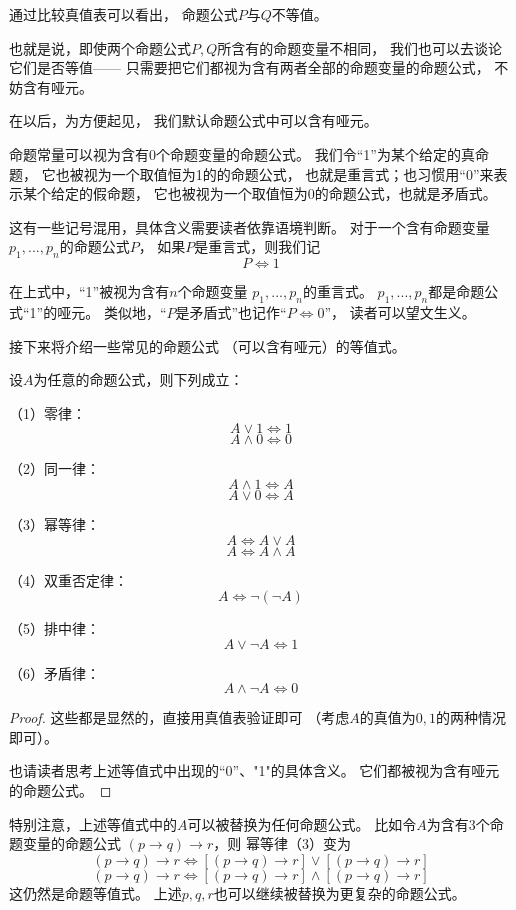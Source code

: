 通过比较真值表可以看出，
命题公式$P$与$Q$不等值。

也就是说，即使两个命题公式$P,Q$所含有的命题变量不相同，
我们也可以去谈论它们是否等值——
只需要把它们都视为含有两者全部的命题变量的命题公式，
不妨含有哑元。

在以后，为方便起见，
我们默认命题公式中可以含有哑元。

\begin{rem}命题常量可以视为含有0个命题变量的命题公式。
我们令“1”为某个给定的真命题，
它也被视为一个取值恒为1的的命题公式，
也就是重言式；也习惯用“0”来表示某个给定的假命题，
它也被视为一个取值恒为0的命题公式，也就是矛盾式。
\end{rem}

这有一些记号混用，具体含义需要读者依靠语境判断。
对于一个含有命题变量$p_1,...,p_n$的命题公式$P$，
如果$P$是重言式，则我们记
$$P\Leftrightarrow 1$$

在上式中，“1”被视为含有$n$个命题变量
$p_1,...,p_n$的重言式。
$p_1,...,p_n$都是命题公式“1”的哑元。
类似地，“$P$是矛盾式”也记作“$P\Leftrightarrow0$”，
读者可以望文生义。\vsp

接下来将介绍一些常见的命题公式
（可以含有哑元）的等值式。

\begin{thm}[基本的命题公式等值式I]\label{prop-dingzhi-gongshi-1}
设$A$为任意的命题公式，则下列成立：

（1）零律：$$A\vee1\Leftrightarrow1$$
$$A\wedge0\Leftrightarrow0$$

（2）同一律：$$A\wedge1\Leftrightarrow A$$
$$A\vee0\Leftrightarrow A$$

（3）幂等律：$$A\Leftrightarrow A\vee A$$
$$A\Leftrightarrow A\wedge A$$

（4）双重否定律：$$A\Leftrightarrow \neg(\neg A)$$

（5）排中律：$$A\vee\neg A\Leftrightarrow1$$

（6）矛盾律：$$A\wedge\neg A\Leftrightarrow0$$

\end{thm}
\begin{proof}
这些都是显然的，直接用真值表验证即可
（考虑$A$的真值为$0,1$的两种情况即可）。

也请读者思考上述等值式中出现的“0”、"1"的具体含义。
它们都被视为含有哑元的命题公式。
\end{proof}

特别注意，上述等值式中的$A$可以被替换为任何命题公式。
比如令$A$为含有3个命题变量的命题公式
$(p\rightarrow q)\rightarrow r$，则
幂等律（3）变为
$$(p\rightarrow q)\rightarrow r
\Leftrightarrow [(p\rightarrow q)\rightarrow r]
\vee [(p\rightarrow q)\rightarrow r]$$
$$(p\rightarrow q)\rightarrow r
\Leftrightarrow [(p\rightarrow q)\rightarrow r]
\wedge [(p\rightarrow q)\rightarrow r]$$
这仍然是命题等值式。
上述$p,q,r$也可以继续被替换为更复杂的命题公式。

